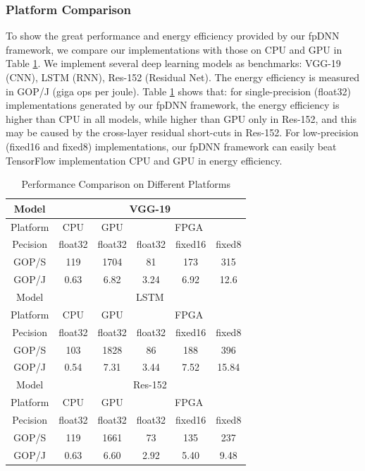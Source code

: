 \documentclass{acm_proc_article-sp-copy}
\begin{document}
\subsubsection{Platform Comparison}
To show the great performance and energy efficiency provided by our fpDNN framework, we compare our implementations with those on CPU and GPU in Table \ref{ee}. We implement several deep learning models as benchmarks: VGG-19 \cite{vgg} (CNN), LSTM \cite{lstm} (RNN), Res-152 \cite{drn} (Residual Net). The energy efficiency is measured in GOP/J (giga ops per joule). Table \ref{ee} shows that: for single-precision (float32) implementations generated by our fpDNN framework, the energy efficiency is higher than CPU in all models, while higher than GPU only in Res-152, and this may be caused by the cross-layer residual short-cuts in Res-152. For low-precision (fixed16 and fixed8) implementations, our fpDNN framework can easily beat TensorFlow implementation CPU and GPU in energy efficiency.

\begin{table}
	\centering
	\begin{tabular}{|c|c|c|c|c|c|}
		\hline
		Model & \multicolumn{5}{|c|}{VGG-19\cite{vgg}}\\
		\hline
		Platform & CPU & GPU & \multicolumn{3}{|c|}{FPGA}\\
		\hline
		Pecision & float32 & float32 & float32 & fixed16 & fixed8 \\
		\hline
		GOP/S & 119 & 1704 & 81 & 173 & 315\\
		\hline
		GOP/J & 0.63 & 6.82 & 3.24 & 6.92 & 12.6\\
		\hline
		Model & \multicolumn{5}{|c|}{LSTM\cite{lstm}}\\
		\hline
		Platform & CPU & GPU & \multicolumn{3}{|c|}{FPGA}\\
		\hline
		Pecision & float32 & float32 & float32 & fixed16 & fixed8 \\
		\hline
		GOP/S & 103 & 1828 & 86 & 188 & 396\\
		\hline
		GOP/J & 0.54 & 7.31 & 3.44 & 7.52 & 15.84\\
		\hline
		Model & \multicolumn{5}{|c|}{Res-152\cite{drn}}\\
		\hline
		Platform & CPU & GPU & \multicolumn{3}{|c|}{FPGA}\\
		\hline
		Pecision & float32 & float32 & float32 & fixed16 & fixed8 \\
		\hline
		GOP/S & 119 & 1661 & 73 & 135 & 237\\
		\hline
		GOP/J & 0.63 & 6.60 & 2.92 & 5.40 & 9.48\\
		\hline
	\end{tabular}
	\caption{Performance Comparison on Different Platforms}
	\label{ee}
\end{table}
\end{document}
